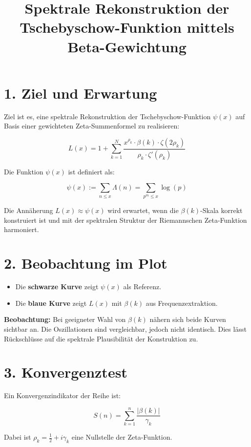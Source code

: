 \documentclass[11pt]{article}
\title{Spektrale Rekonstruktion der Tschebyschow-Funktion mittels Beta-Gewichtung}
\author{}
\date{}
\begin{document}
\maketitle

\section*{1. Ziel und Erwartung}

Ziel ist es, eine spektrale Rekonstruktion der Tschebyschow-Funktion $\psi(x)$ auf Basis einer gewichteten Zeta-Summenformel zu realisieren:

\[
L(x) = 1 + \sum_{k=1}^{N} \frac{x^{\rho_k} \cdot \beta(k) \cdot \zeta(2\rho_k)}{\rho_k \cdot \zeta'(\rho_k)}
\]

Die Funktion $\psi(x)$ ist definiert als:

\[
\psi(x) := \sum_{n \le x} \Lambda(n) = \sum_{p^m \le x} \log(p)
\]

Die Annäherung $L(x) \approx \psi(x)$ wird erwartet, wenn die $\beta(k)$-Skala korrekt konstruiert ist und mit der spektralen Struktur der Riemannschen Zeta-Funktion harmoniert.

\section*{2. Beobachtung im Plot}

\begin{itemize}
    \item Die \textbf{schwarze Kurve} zeigt $\psi(x)$ als Referenz.
    \item Die \textbf{blaue Kurve} zeigt $L(x)$ mit $\beta(k)$ aus Frequenzextraktion.
\end{itemize}

\textbf{Beobachtung:} Bei geeigneter Wahl von $\beta(k)$ nähern sich beide Kurven sichtbar an. Die Oszillationen sind vergleichbar, jedoch nicht identisch. Dies lässt Rückschlüsse auf die spektrale Plausibilität der Konstruktion zu.

\section*{3. Konvergenztest}

Ein Konvergenzindikator der Reihe ist:

\[
S(n) = \sum_{k=1}^{n} \frac{|\beta(k)|}{\gamma_k}
\]

Dabei ist $\rho_k = \frac{1}{2} + i\gamma_k$ eine Nullstelle der Zeta-Funktion.
\end{document}
